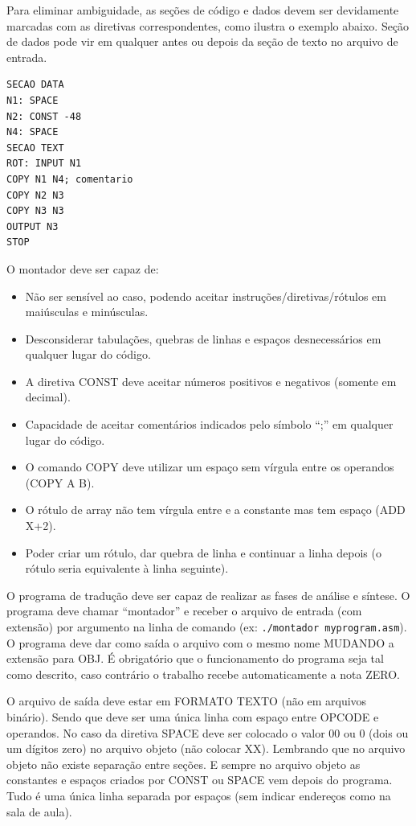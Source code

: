\documentclass[11pt, a4paper]{article}
\begin{document}
Para eliminar ambiguidade, as seções de código e dados devem ser devidamente marcadas com as diretivas correspondentes, como ilustra o exemplo abaixo. Seção de dados pode vir em qualquer antes ou depois da seção de texto no arquivo de entrada.

\begin{verbatim}
SECAO DATA
N1: SPACE
N2: CONST -48
N4: SPACE
SECAO TEXT
ROT: INPUT N1
COPY N1 N4; comentario
COPY N2 N3
COPY N3 N3
OUTPUT N3
STOP
\end{verbatim}

O montador deve ser capaz de:
\begin{itemize}
    \item Não ser sensível ao caso, podendo aceitar instruções/diretivas/rótulos em maiúsculas e minúsculas.
    \item Desconsiderar tabulações, quebras de linhas e espaços desnecessários em qualquer lugar do código.
    \item A diretiva CONST deve aceitar números positivos e negativos (somente em decimal).
    \item Capacidade de aceitar comentários indicados pelo símbolo ``;'' em qualquer lugar do código.
    \item O comando COPY deve utilizar um espaço sem vírgula entre os operandos (COPY A B).
    \item O rótulo de array não tem vírgula entre e a constante mas tem espaço (ADD X+2).
    \item Poder criar um rótulo, dar quebra de linha e continuar a linha depois (o rótulo seria equivalente à linha seguinte).
\end{itemize}

O programa de tradução deve ser capaz de realizar as fases de análise e síntese. O programa deve chamar ``montador'' e receber o arquivo de entrada (com extensão) por argumento na linha de comando (ex: \texttt{./montador myprogram.asm}). O programa deve dar como saída o arquivo com o mesmo nome MUDANDO a extensão para OBJ. É obrigatório que o funcionamento do programa seja tal como descrito, caso contrário o trabalho recebe automaticamente a nota ZERO.

O arquivo de saída deve estar em FORMATO TEXTO (não em arquivos binário). Sendo que deve ser uma única linha com espaço entre OPCODE e operandos. No caso da diretiva SPACE deve ser colocado o valor 00 ou 0 (dois ou um dígitos zero) no arquivo objeto (não colocar XX). Lembrando que no arquivo objeto não existe separação entre seções. E sempre no arquivo objeto as constantes e espaços criados por CONST ou SPACE vem depois do programa. Tudo é uma única linha separada por espaços (sem indicar endereços como na sala de aula).
\end{document}
